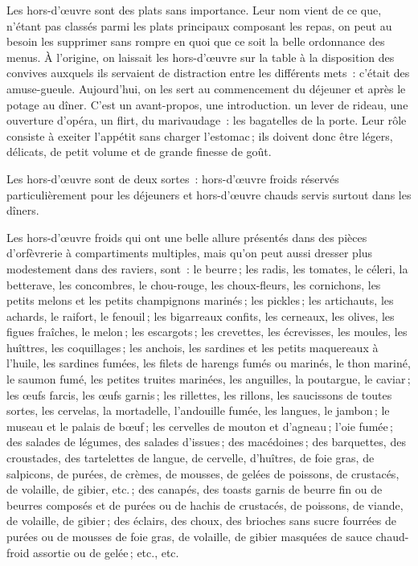 Les hors-d'œuvre sont des plats sans importance. Leur nom vient de ce que,
n'étant pas classés parmi les plats principaux composant les repas, on peut au
besoin les supprimer sans rompre en quoi que ce soit la belle ordonnance des
menus. À l'origine, on laissait les hors-d'œuvre sur la table à la disposition
des convives auxquels ils servaient de distraction entre les différents mets :
c'était des amuse-gueule. Aujourd'hui, on les sert au commencement du déjeuner
et après le potage au dîner. C'est un avant-propos, une introduction. un lever
de rideau, une ouverture d'opéra, un flirt, du marivaudage : les bagatelles de
la porte. Leur rôle consiste à exeiter l'appétit sans charger l'estomac ; ils
doivent donc être légers, délicats, de petit volume et de grande finesse de
goût.

Les hors-d'œuvre sont de deux sortes : hors-d’œuvre froids réservés
particulièrement pour les déjeuners et hors-d'œuvre chauds servis surtout dans
les dîners.

Les hors-d'œuvre froids qui ont une belle allure présentés dans des pièces
d'orfèvrerie à compartiments multiples, mais qu'on peut aussi dresser plus
modestement dans des raviers, sont : le beurre ; les radis, les tomates, le
céleri, la betterave, les concombres, le chou-rouge, les choux-fleurs, les
cornichons, les petits melons et les petits champignons marinés ; les pickles ;
les artichauts, les achards, le raifort, le fenouil ; les bigarreaux confits,
les cerneaux, les olives, les figues fraîches, le melon ; les escargots ; les
crevettes, les écrevisses, les moules, les huîttres, les coquillages ; les
anchois, les sardines et les petits maquereaux à l'huile, les sardines fumées,
les filets de harengs fumés ou marinés, le thon mariné, le saumon fumé, les
petites truites marinées, les anguilles, la poutargue, le caviar ; les œufs
farcis, les œufs garnis ; les rillettes, les rillons, les saucissons de toutes
sortes, les cervelas, la mortadelle, l'andouille fumée, les langues, le
jambon ; le museau et le palais de bœuf ; les cervelles de mouton et d'agneau ;
l’oie fumée ; des salades de légumes, des salades d'issues ; des macédoines ;
des barquettes, des croustades, des tartelettes de langue, de cervelle,
d'huîtres, de foie gras, de salpicons, de purées, de crèmes, de mousses, de
gelées de poissons, de crustacés, de volaille, de gibier, etc. ; des canapés,
des toasts garnis de beurre fin ou de beurres composés et de purées ou de
hachis de crustacés, de poissons, de viande, de volaille, de gibier ; des
éclairs, des choux, des brioches sans sucre fourrées de purées ou de mousses de
foie gras, de volaille, de gibier masquées de sauce chaud-froid assortie ou de
gelée ; etc., etc.

